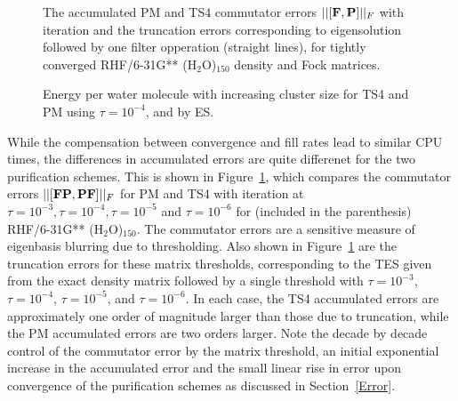 \commentoutA{\documentclass[prb,aps,twocolumn,twocolumngrid,secnumarabic,superbib,hyperref]{revtex4}}
\begin{document}
{\begin{figure}[b]
\caption{The accumulated PM and TS4 commutator errors $||[{\bf F ,P }]||_F$ 
with iteration and the truncation errors corresponding to eigensolution followed
by one filter opperation (straight lines), for tightly converged RHF/6-31G** (H$_2$O)$_{150}$ density 
and Fock matrices.}\label{commerrors}
\end{figure}

\begin{figure}[b]
\caption{Energy per water molecule with increasing cluster size for TS4 and PM 
         using $\tau=10^{-4}$, and by ES.}\label{waterenergyerrors}
\end{figure}

While the compensation between convergence and fill rates lead to similar CPU times, 
the differences in accumulated errors are quite differenet for the two purification schemes.
This is shown in Figure~\ref{commerrors}, which compares the commutator errors $||[{\bf FP,PF}]||_F$
for PM and TS4 with iteration at $\tau=10^{-3}, \tau=10^{-4}, \tau=10^{-5}$ and $\tau=10^{-6}$
for (included in the parenthesis) RHF/6-31G** (H$_2$O)$_{150}$. 
The commutator errors are a sensitive measure of eigenbasis
blurring due to thresholding.  Also shown in Figure~\ref{commerrors} 
are the truncation errors for these matrix thresholds, corresponding to the TES 
given from the exact density matrix followed by a single threshold with
$\tau = 10 ^{-3}$, $\tau = 10 ^{-4}$, $\tau = 10 ^{-5}$, and $\tau = 10 ^{-6}$.  
In each case, the TS4 accumulated errors are approximately one order of 
magnitude larger than those due to truncation, while the PM accumulated errors are two
orders larger.  Note the decade by decade control of the commutator error by the matrix
threshold, an initial exponential increase in the accumulated error and the 
small linear rise in error upon convergence of the purification schemes as discussed
in Section~\ref{Error}.


}
\end{document}
